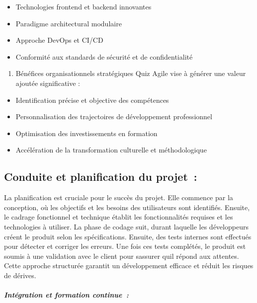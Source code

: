 \documentclass[12pt,a4paper,twoside]{report}
\begin{document}
\begin{itemize}
\item
  Technologies frontend et backend innovantes
\item
  Paradigme architectural modulaire
\item
  Approche DevOps et CI/CD
\item
  Conformité aux standards de sécurité et de confidentialité
\end{itemize}

\begin{enumerate}
\def\labelenumi{\arabic{enumi}.}
\setcounter{enumi}{4}
\item
  Bénéfices organisationnels stratégiques Quiz Agile vise à générer une
  valeur ajoutée significative :
\end{enumerate}

\begin{itemize}
\item
  Identification précise et objective des compétences
\item
  Personnalisation des trajectoires de développement professionnel
\item
  Optimisation des investissements en formation
\item
  Accélération de la transformation culturelle et méthodologique
\end{itemize}

\hypertarget{conduite-et-planification-du-projet}{%
\subsection{Conduite et planification du
projet~:}\label{conduite-et-planification-du-projet}}

La planification est cruciale pour le succès du projet. Elle commence
par la conception, où les objectifs et les besoins des utilisateurs sont
identifiés. Ensuite, le cadrage fonctionnel et technique établit les
fonctionnalités requises et les technologies à utiliser. La phase de
codage suit, durant laquelle les développeurs créent le produit selon
les spécifications. Ensuite, des tests internes sont effectués pour
détecter et corriger les erreurs. Une fois ces tests complétés, le
produit est soumis à une validation avec le client pour
s\textquotesingle assurer qu\textquotesingle il répond aux attentes.
Cette approche structurée garantit un développement efficace et réduit
les risques de dérives.

\hypertarget{intuxe9gration-et-formation-continue}{%
\subparagraph{Intégration et formation
continue~:}\label{intuxe9gration-et-formation-continue}}
\end{document}
